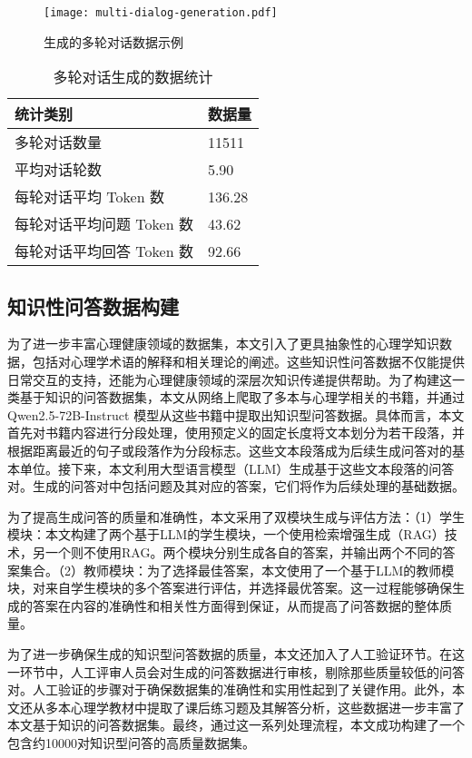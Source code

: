 \begin{figure}[ht]
  \centering
  \texttt{[image: multi-dialog-generation.pdf]}
  \caption{生成的多轮对话数据示例}
  \label{fig:multi-dialog-generation}
\end{figure}

\begin{table}
  \centering
  \caption{多轮对话生成的数据统计}
  \label{tab:multi-dialog-statistics}
  \begin{tabular}{ll}
    \toprule
    统计类别 & 数据量 \\
    \midrule
    多轮对话数量 & 11511 \\
    平均对话轮数 & 5.90 \\
    每轮对话平均 Token 数 & 136.28 \\
    每轮对话平均问题 Token 数 & 43.62 \\
    每轮对话平均回答 Token 数 & 92.66 \\
    \bottomrule
  \end{tabular}
\end{table}

\subsection{知识性问答数据构建}

为了进一步丰富心理健康领域的数据集，本文引入了更具抽象性的心理学知识数据，包括对心理学术语的解释和相关理论的阐述。这些知识性问答数据不仅能提供日常交互的支持，还能为心理健康领域的深层次知识传递提供帮助。为了构建这一类基于知识的问答数据集，本文从网络上爬取了多本与心理学相关的书籍，并通过 Qwen2.5-72B-Instruct 模型从这些书籍中提取出知识型问答数据。具体而言，本文首先对书籍内容进行分段处理，使用预定义的固定长度将文本划分为若干段落，并根据距离最近的句子或段落作为分段标志。这些文本段落成为后续生成问答对的基本单位。接下来，本文利用大型语言模型（LLM）生成基于这些文本段落的问答对。生成的问答对中包括问题及其对应的答案，它们将作为后续处理的基础数据。

为了提高生成问答的质量和准确性，本文采用了双模块生成与评估方法：（1）学生模块：本文构建了两个基于LLM的学生模块，一个使用检索增强生成（RAG）技术，另一个则不使用RAG。两个模块分别生成各自的答案，并输出两个不同的答案集合。（2）教师模块：为了选择最佳答案，本文使用了一个基于LLM的教师模块，对来自学生模块的多个答案进行评估，并选择最优答案。这一过程能够确保生成的答案在内容的准确性和相关性方面得到保证，从而提高了问答数据的整体质量。

为了进一步确保生成的知识型问答数据的质量，本文还加入了人工验证环节。在这一环节中，人工评审人员会对生成的问答数据进行审核，剔除那些质量较低的问答对。人工验证的步骤对于确保数据集的准确性和实用性起到了关键作用。此外，本文还从多本心理学教材中提取了课后练习题及其解答分析，这些数据进一步丰富了本文基于知识的问答数据集。最终，通过这一系列处理流程，本文成功构建了一个包含约10000对知识型问答的高质量数据集。

